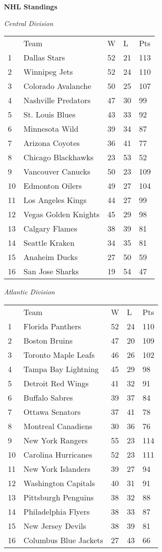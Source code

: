 \textbf{NHL Standings}

\textit{Central Division}
\begin{tabular}{lllll}
 & Team & W & L & Pts \\
1 & Dallas Stars & 52 & 21 & 113 \\
2 & Winnipeg Jets & 52 & 24 & 110 \\
3 & Colorado Avalanche & 50 & 25 & 107 \\
4 & Nashville Predators & 47 & 30 & 99 \\
5 & St. Louis Blues & 43 & 33 & 92 \\
6 & Minnesota Wild & 39 & 34 & 87 \\
7 & Arizona Coyotes & 36 & 41 & 77 \\
8 & Chicago Blackhawks & 23 & 53 & 52 \\
9 & Vancouver Canucks & 50 & 23 & 109 \\
10 & Edmonton Oilers & 49 & 27 & 104 \\
11 & Los Angeles Kings & 44 & 27 & 99 \\
12 & Vegas Golden Knights & 45 & 29 & 98 \\
13 & Calgary Flames & 38 & 39 & 81 \\
14 & Seattle Kraken & 34 & 35 & 81 \\
15 & Anaheim Ducks & 27 & 50 & 59 \\
16 & San Jose Sharks & 19 & 54 & 47 \\
\end{tabular}


\textit{Atlantic Division}
\begin{tabular}{lllll}
 & Team & W & L & Pts \\
1 & Florida Panthers & 52 & 24 & 110 \\
2 & Boston Bruins & 47 & 20 & 109 \\
3 & Toronto Maple Leafs & 46 & 26 & 102 \\
4 & Tampa Bay Lightning & 45 & 29 & 98 \\
5 & Detroit Red Wings & 41 & 32 & 91 \\
6 & Buffalo Sabres & 39 & 37 & 84 \\
7 & Ottawa Senators & 37 & 41 & 78 \\
8 & Montreal Canadiens & 30 & 36 & 76 \\
9 & New York Rangers & 55 & 23 & 114 \\
10 & Carolina Hurricanes & 52 & 23 & 111 \\
11 & New York Islanders & 39 & 27 & 94 \\
12 & Washington Capitals & 40 & 31 & 91 \\
13 & Pittsburgh Penguins & 38 & 32 & 88 \\
14 & Philadelphia Flyers & 38 & 33 & 87 \\
15 & New Jersey Devils & 38 & 39 & 81 \\
16 & Columbus Blue Jackets & 27 & 43 & 66 \\
\end{tabular}


